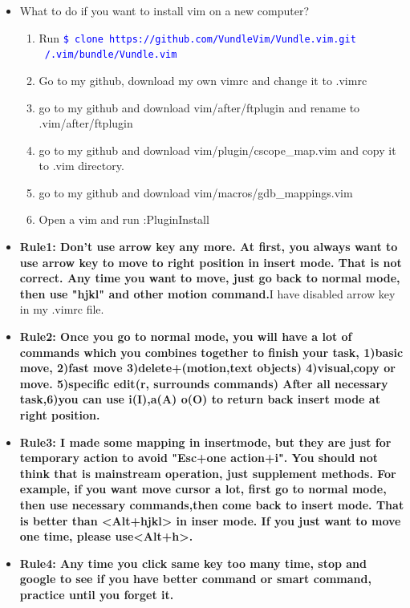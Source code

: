 \documentclass[a4paper,12pt,twoside]{book}
\newcommand{\linuxcommand}[1]{\texttt{\textcolor{blue}{\$ #1 \Pisymbol{psy}{191}}}}
\begin{document}
\begin{itemize}
		\item What to do if you want to install vim on a new computer?

\begin{enumerate}
		\item Run \linuxcommand{clone https://github.com/VundleVim/Vundle.vim.git ~/.vim/bundle/Vundle.vim}
		\item Go to my github, download my own vimrc and change it to .vimrc
		\item go to my github and download vim/after/ftplugin and rename to .vim/after/ftplugin
		\item go to my github and download vim/plugin/cscope\_map.vim and copy it to .vim directory.
		\item go to my github and download vim/macros/gdb\_mappings.vim
		\item Open a vim and run :PluginInstall
\end{enumerate}

		\item \textbf{Rule1: Don't use arrow key any more. At first, you always want to use arrow key to move to right position in insert mode. That is not correct. Any time you want to move, just go back to normal mode, then use "hjkl" and other motion command.}I have disabled arrow key in my .vimrc file.

		\item \textbf{Rule2: Once you go to normal mode, you will have a lot of commands which you combines together to finish your task, 1)basic move, 2)fast move 3)delete+(motion,text objects) 4)visual,copy or move. 5)specific edit(r, surrounds commands) After all necessary task,6)you can use i(I),a(A) o(O) to return back insert mode at right position.}

		\item \textbf{Rule3: I made some mapping in insertmode, but they are just for temporary action to avoid "Esc+one action+i". You should not think that is mainstream operation, just supplement methods. For example, if you want move cursor a lot, first go to normal mode, then use necessary commands,then come back to insert mode. That is better than <Alt+hjkl> in inser mode. If you just want to move one time, please use<Alt+h>.}

		\item \textbf{Rule4: Any time you click same key too many time, stop and google to see if you have better command or smart command, practice until you forget it. }


\end{itemize}
\end{document}
